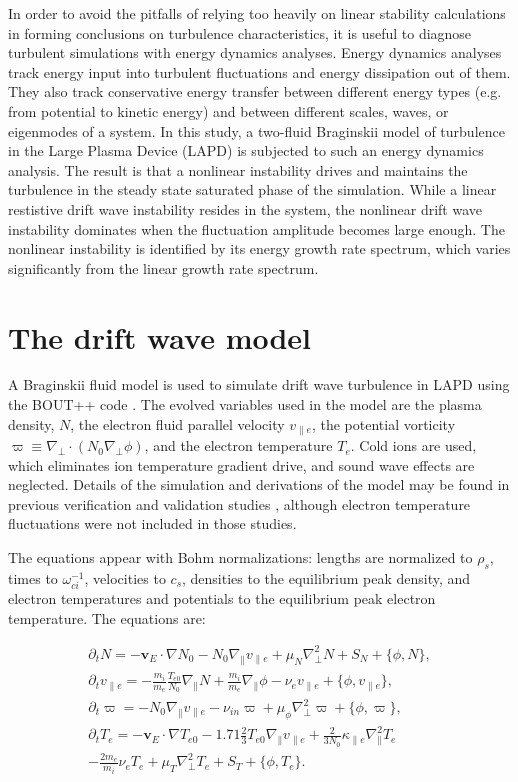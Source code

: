 \documentclass[twocolumn,showpacs,preprintnumbers,amsmath,amssymb]{revtex4}
\def\beqar{\begin{eqnarray}}
\def\eeqar{\end{eqnarray}}
\newcommand{\pdt}{\partial_t}
\def\grad{\nabla}
\newcommand{\gradpar}{\grad_\parallel}
\newcommand{\gradperp}{\grad_\perp}
\newcommand{\vpe}{v_{\parallel e}}
\newcommand{\nue}{\nu_{e}}
\newcommand{\nuin}{\nu_{in}}
\newcommand{\kpe}{\kappa_{\parallel e}}
\newcommand{\fmie}{\frac{m_i}{m_e}}
\begin{document}
In order to avoid the pitfalls of relying too heavily on linear stability calculations in forming conclusions on turbulence characteristics, it is useful to diagnose turbulent simulations
with energy dynamics analyses. Energy dynamics analyses track energy input into turbulent fluctuations and energy dissipation out of them. They also track conservative energy transfer
between different energy types (e.g. from potential to kinetic energy) and between different scales, waves, or eigenmodes of a system. In this study, a 
two-fluid Braginskii model of turbulence in the Large Plasma Device (LAPD) is subjected to such an energy dynamics analysis. The result is that a nonlinear instability drives and maintains
the turbulence in the steady state saturated phase of the simulation. While a linear restistive drift wave instability resides in the system, the nonlinear drift wave instability dominates
when the fluctuation amplitude becomes large enough. The nonlinear instability is identified by its energy growth rate spectrum, which varies significantly from the linear growth rate spectrum.


\section{The drift wave model}
\label{dw_model}

A Braginskii fluid model \cite{Braginskii1965} is used to simulate drift wave turbulence in LAPD using the BOUT++ code \cite{dudson2009}. 
The evolved variables used in the model are the plasma density, $N$, the electron fluid parallel velocity $\vpe$, the potential vorticity $\varpi \equiv \gradperp \cdot (N_0 \gradperp \phi)$,
and the electron temperature $T_e$. Cold ions are used, which eliminates ion temperature gradient drive, and sound wave effects are neglected. Details of the simulation and derivations of the model
may be found in previous verification and validation studies \cite{Popovich2010a,Popovich2010b,Umansky2011,friedman2012}, although electron temperature fluctuations were not included in those studies.

The equations appear with Bohm normalizations: lengths are normalized to $\rho_s$, times to $\omega_{ci}^{-1}$, velocities to $c_s$, densities to the equilibrium peak density, and electron
temperatures and potentials to the equilibrium peak electron temperature. The equations are:

\beqar
\label{ni_eq}
\pdt N = - {\mathbf v_E} \cdot \grad N_0 - N_0 \gradpar \vpe + \mu_N \gradperp^2 N + S_N + \{\phi,N\}, \\
\label{ve_eq}
\pdt \vpe = - \fmie \frac{T_{e0}}{N_0} \gradpar N + \fmie \gradpar \phi - \nue \vpe + \{\phi,\vpe \}, \\
\label{rho_eq}
\pdt \varpi = - N_0 \gradpar \vpe  - \nuin \varpi + \mu_\phi \gradperp^2 \varpi + \{\phi,\varpi \}, \\
\label{te_eq}
\pdt T_e = - {\mathbf v_E} \cdot \grad T_{e0} - 1.71 \frac{2}{3} T_{e0} \gradpar \vpe + \frac{2}{3 N_0} \kpe \gradpar^2 T_e  \nonumber \\
- \frac{2 m_e}{m_i} \nue T_e  + \mu_T \gradperp^2 T_e +  S_T + \{\phi,T_e\}.
\eeqar
\end{document}
